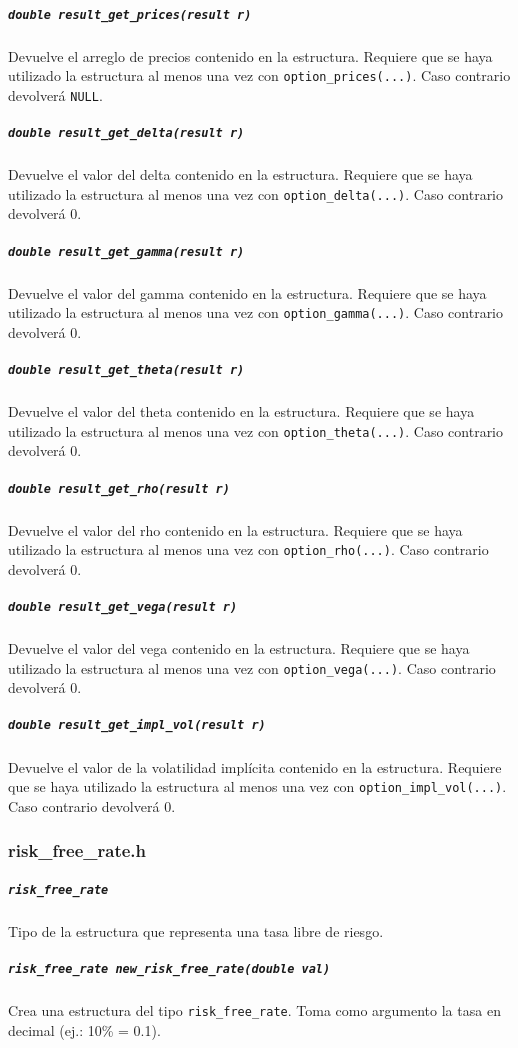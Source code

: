 \documentclass[12pt,a4paper,final]{article}
\begin{document}
			\subparagraph{\texttt{double result\_get\_prices(result r)}}
				Devuelve el arreglo de precios contenido en la estructura.
				Requiere que se haya utilizado la estructura al menos una vez 
				con \texttt{option\_prices(...)}. Caso contrario devolverá
				\texttt{NULL}.
				
			\subparagraph{\texttt{double result\_get\_delta(result r)}}
				Devuelve el valor del delta contenido en la estructura.
				Requiere que se haya utilizado la estructura al menos una vez 
				con \texttt{option\_delta(...)}. Caso contrario devolverá 0.
				
			\subparagraph{\texttt{double result\_get\_gamma(result r)}}
				Devuelve el valor del gamma contenido en la estructura.
				Requiere que se haya utilizado la estructura al menos una vez 
				con \texttt{option\_gamma(...)}. Caso contrario devolverá 0.
				
			\subparagraph{\texttt{double result\_get\_theta(result r)}}
				Devuelve el valor del theta contenido en la estructura.
				Requiere que se haya utilizado la estructura al menos una vez 
				con \texttt{option\_theta(...)}. Caso contrario devolverá 0.
				
			\subparagraph{\texttt{double result\_get\_rho(result r)}}
				Devuelve el valor del rho contenido en la estructura.
				Requiere que se haya utilizado la estructura al menos una vez 
				con \texttt{option\_rho(...)}. Caso contrario devolverá 0.
				
			\subparagraph{\texttt{double result\_get\_vega(result r)}}
				Devuelve el valor del vega contenido en la estructura.
				Requiere que se haya utilizado la estructura al menos una vez 
				con \texttt{option\_vega(...)}. Caso contrario devolverá 0.
				
			\subparagraph{\texttt{double result\_get\_impl\_vol(result r)}}
				Devuelve el valor de la volatilidad implícita contenido en la estructura.
				Requiere que se haya utilizado la estructura al menos una vez 
				con \texttt{option\_impl\_vol(...)}. Caso contrario devolverá 0.
				
		\subsubsection{risk\_free\_rate.h}
			
			\subparagraph{\texttt{risk\_free\_rate}}
				Tipo de la estructura que representa una tasa libre de riesgo.
				
			\subparagraph{\texttt{risk\_free\_rate new\_risk\_free\_rate(double val)}}
				Crea una estructura del tipo \texttt{risk\_free\_rate}. Toma como argumento
				la tasa en decimal (ej.: 10\% = 0.1).
				
\end{document}

